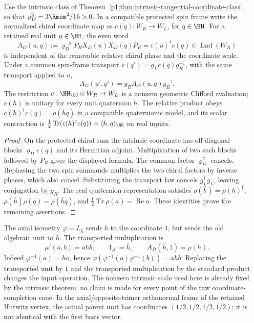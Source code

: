 \documentclass[11pt]{article}
\begin{document}
\begin{theorem}
\label{p1:thm:intrinsic-even-hopf-hurwitz-comparison}
Use the intrinsic class of
Theorem~\ref{p1:thm:intrinsic-tangential-coordinate-class}, so that
\(\varrho_D^2=3\Rmom^2/16>0\).  In a compatible protected spin frame write
the normalized chiral coordinate map as
\(c(q):W_R\to W_L\), for \(q\in\HH\).  For a retained real unit
\(u\in\HH\), the even word
\[
 A_D(u,q):=\varrho_D^{-2}P_RX_D(u)X_D(q)P_R
          =c(u)^\dagger c(q)\in\operatorname{End}(W_R)
\]
is independent of the removable relative chiral phase and the coordinate
scale.  Under a common spin-frame transport
\(c(q')=g_Lc(q)g_R^{-1}\), with the same transport applied to \(u\),
\[
 A_D(u',q')=g_RA_D(u,q)g_R^{-1}.
\]
The restriction \(c:\HH_{\CC}\otimes W_R\to W_L\) is a nonzero
geometric Clifford evaluation; \(c(h)\) is unitary for every unit
quaternion \(h\).  The relative product obeys
\(c(h)^\dagger c(q)=\rho(\bar hq)\) in a compatible quaternionic model,
and its scalar contraction is
\(\tfrac12\operatorname{Tr}(c(h)^\dagger c(q))=\langle h,q\rangle_{\RR}\)
on real inputs.
\end{theorem}

\begin{proof}
On the protected chiral sum the intrinsic coordinate has off-diagonal blocks
\(\varrho_Dc(q)\) and its Hermitian adjoint.  Multiplication of two such
blocks followed by \(P_R\) gives the displayed formula.  The common factor
\(\varrho_D^2\) cancels.  Rephasing the two spin summands multiplies the
two chiral factors by inverse phases, which also cancel.  Substituting the
transport law cancels \(g_L^\dagger g_L\), leaving conjugation by \(g_R\).
The real quaternion representation satisfies
\(\rho(\bar h)=\rho(h)^\dagger\),
\(\rho(\bar h)\rho(q)=\rho(\bar hq)\), and
\(\tfrac12\operatorname{Tr}\rho(a)=\operatorname{Re}a\).
These identities prove the remaining assertions.
\end{proof}

\begin{remark}
\label{p1:rem:joint-comparison-unit-transport}
The axial isometry \(\varphi=L_{\bar h}\) sends \(h\) to the coordinate
\(1\), but sends the old algebraic unit to \(\bar h\).  The transported
multiplication is
\[
 \mu'(a,b)=ahb,\qquad 1_{\mu'}=\bar h,
 \qquad A_D(\bar h,1)=\rho(h).
\]
Indeed \(\varphi^{-1}(a)=ha\), hence
\(\varphi(\varphi^{-1}(a)\varphi^{-1}(b))=ahb\).
Replacing the transported unit by \(1\) and the transported multiplication
by the standard product changes the input operation.  The nonzero intrinsic
scale used here is already fixed by the intrinsic theorem; no claim is made
for every point of the raw coordinate-completion cone.
In the axial/opposite-trimer orthonormal frame of the retained Hurwitz
vertex, the actual parent unit has coordinates
\((1/2,1/2,1/2,1/2)\); it is not identical with the first basis vector.
\end{remark}
\end{document}
